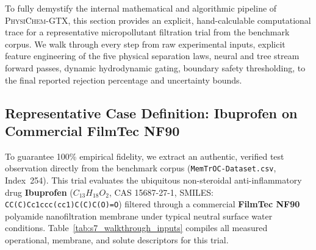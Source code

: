 \documentclass[11pt]{article}
\begin{document}
To fully demystify the internal mathematical and algorithmic pipeline of \textsc{PhysiChem-GTX}, this section provides an explicit, hand-calculable computational trace for a representative micropollutant filtration trial from the benchmark corpus. We walk through every step from raw experimental inputs, explicit feature engineering of the five physical separation laws, neural and tree stream forward passes, dynamic hydrodynamic gating, boundary safety thresholding, to the final reported rejection percentage and uncertainty bounds.

\subsection{Representative Case Definition: Ibuprofen on Commercial FilmTec NF90}
\label{sec:walkthrough_case}

To guarantee 100\% empirical fidelity, we extract an authentic, verified test observation directly from the benchmark corpus (\texttt{MemTrOC-Dataset.csv}, Index~254). This trial evaluates the ubiquitous non-steroidal anti-inflammatory drug \textbf{Ibuprofen} ($C_{13}H_{18}O_2$, CAS 15687-27-1, SMILES: \texttt{CC(C)Cc1ccc(cc1)C(C)C(O)=O}) filtered through a commercial \textbf{FilmTec NF90} polyamide nanofiltration membrane under typical neutral surface water conditions. Table~\ref{tab:s7_walkthrough_inputs} compiles all measured operational, membrane, and solute descriptors for this trial.
\end{document}
